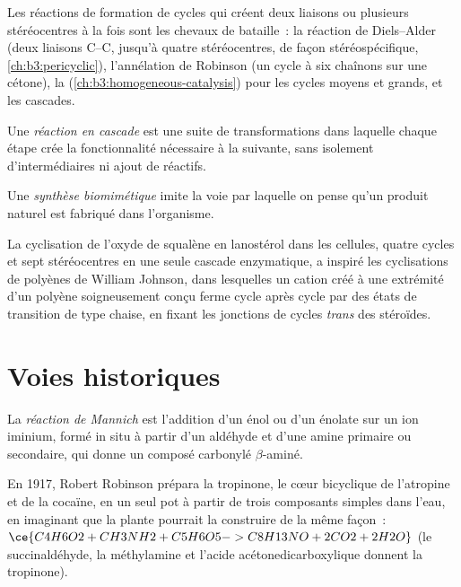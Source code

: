 Les réactions de formation de cycles qui créent deux liaisons ou plusieurs
stéréocentres à la fois sont les chevaux de bataille~: la réaction de
Diels--Alder (deux liaisons C--C, jusqu'à quatre stéréocentres, de façon
stéréospécifique, \cref{ch:b3:pericyclic}), l'annélation de Robinson (un
cycle à six chaînons sur une cétone), la 
(\cref{ch:b3:homogeneous-catalysis}) pour les cycles moyens et grands, et
les cascades.

\begin{definition}\label{def:b3:total-synthesis:cascade}
Une \emph{réaction en cascade} est une suite de
transformations dans laquelle chaque étape crée la fonctionnalité
nécessaire à la suivante, sans isolement d'intermédiaires ni ajout de
réactifs.
\end{definition}

\begin{definition}\label{def:b3:total-synthesis:biomimetic}
Une \emph{synthèse biomimétique} imite la voie
par laquelle on pense qu'un produit naturel est fabriqué dans l'organisme.
\end{definition}

La cyclisation de l'oxyde de squalène en lanostérol dans les cellules,
quatre cycles et sept stéréocentres en une seule cascade enzymatique, a
inspiré les cyclisations de polyènes de William Johnson, dans lesquelles un
cation créé à une extrémité d'un polyène soigneusement conçu ferme cycle
après cycle par des états de transition de type chaise, en fixant les
jonctions de cycles \textit{trans} des stéroïdes.

\section{Voies historiques}

\begin{definition}\label{def:b3:total-synthesis:mannich}
La \emph{réaction de Mannich} est l'addition d'un
énol ou d'un énolate sur un ion iminium, formé in situ à partir d'un
aldéhyde et d'une amine primaire ou secondaire, qui donne un composé carbonylé $\beta$-aminé.
\end{definition}

En 1917, Robert Robinson prépara la tropinone, le cœur bicyclique de
l'atropine et de la cocaïne, en un seul pot à partir de trois composants
simples dans l'eau, en imaginant que la plante pourrait la construire de la
même façon~:
$\ce{C4H6O2 + CH3NH2 + C5H6O5 -> C8H13NO + 2CO2 + 2H2O}$ (le succinaldéhyde, la méthylamine et
l'acide acétonedicarboxylique donnent la tropinone).

